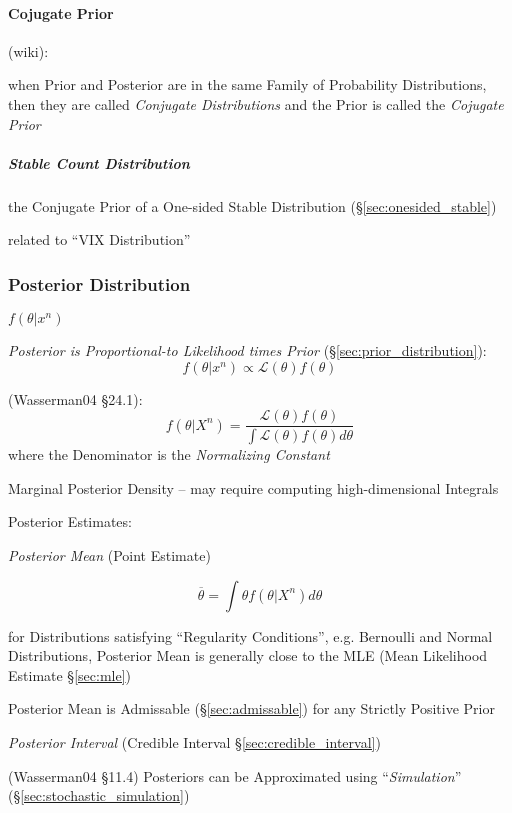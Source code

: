 \paragraph{Cojugate Prior}\label{sec:conjugate_prior}\hfill

(wiki):

when Prior and Posterior are in the same Family of Probability Distributions,
then they are called \emph{Conjugate Distributions} and the Prior is called the
\emph{Cojugate Prior}



\subparagraph{Stable Count Distribution}\label{sec:stable_count}\hfill

the Conjugate Prior of a One-sided Stable Distribution
(\S\ref{sec:onesided_stable})

related to ``VIX Distribution''



\subsubsection{Posterior Distribution}\label{sec:posterior_distribution}

$f(\theta | x^n)$

\emph{Posterior is Proportional-to Likelihood times Prior}
(\S\ref{sec:prior_distribution}):
\[
  f(\theta | x^n) \propto \mathcal{L}(\theta)f(\theta)
\]

(Wasserman04 \S24.1):
\[
  f(\theta | X^n) = \frac{
    \mathcal{L}(\theta) f(\theta)
  }{
    \int \mathcal{L}(\theta) f(\theta) d\theta
  }
\]
where the Denominator is the \emph{Normalizing Constant}

Marginal Posterior Density -- may require computing high-dimensional Integrals

Posterior Estimates:

\emph{Posterior Mean} (Point Estimate)

\[
  \overline{\theta} = \int \theta f(\theta | X^n) d\theta
\]

for Distributions satisfying ``Regularity Conditions'', e.g. Bernoulli and
Normal Distributions, Posterior Mean is generally close to the MLE (Mean
Likelihood Estimate \S\ref{sec:mle})

Posterior Mean is Admissable (\S\ref{sec:admissable}) for any Strictly Positive
Prior

\emph{Posterior Interval} (Credible Interval \S\ref{sec:credible_interval})

(Wasserman04 \S11.4) Posteriors can be Approximated using ``\emph{Simulation}''
(\S\ref{sec:stochastic_simulation})

